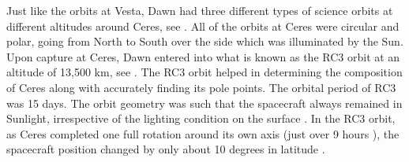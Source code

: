 Just like the orbits at Vesta, Dawn had three different types of science orbits at different altitudes around Ceres, see . All of the orbits at Ceres were circular and polar, going from North to South over the side which was illuminated by the Sun. Upon capture at Ceres, Dawn entered into what is known as the \gls{RC3} orbit at an altitude of 13,500 km, see . The \gls{RC3} orbit helped in determining the composition of Ceres along with accurately finding its pole points. The orbital period of \gls{RC3} was 15 days. The orbit geometry was such that the spacecraft always remained in Sunlight, irrespective of the lighting condition on the surface \cite{dawnblog}. In the RC3 orbit, as Ceres completed one full rotation around its own axis (just over 9 hours \cite{dawnblog}), the spacecraft position changed by only about 10 degrees in latitude \cite{ceresorbits}.

